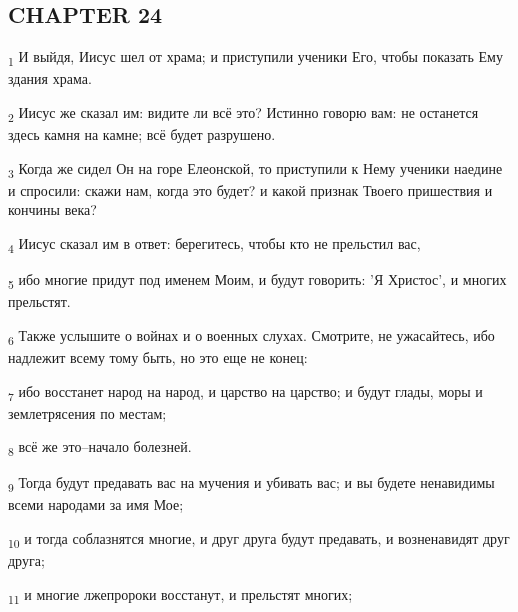 \subsection{CHAPTER 24}
\begin{tcolorbox}
\textsubscript{1} И выйдя, Иисус шел от храма; и приступили ученики Его, чтобы показать Ему здания храма.
\end{tcolorbox}
\begin{tcolorbox}
\textsubscript{2} Иисус же сказал им: видите ли всё это? Истинно говорю вам: не останется здесь камня на камне; всё будет разрушено.
\end{tcolorbox}
\begin{tcolorbox}
\textsubscript{3} Когда же сидел Он на горе Елеонской, то приступили к Нему ученики наедине и спросили: скажи нам, когда это будет? и какой признак Твоего пришествия и кончины века?
\end{tcolorbox}
\begin{tcolorbox}
\textsubscript{4} Иисус сказал им в ответ: берегитесь, чтобы кто не прельстил вас,
\end{tcolorbox}
\begin{tcolorbox}
\textsubscript{5} ибо многие придут под именем Моим, и будут говорить: 'Я Христос', и многих прельстят.
\end{tcolorbox}
\begin{tcolorbox}
\textsubscript{6} Также услышите о войнах и о военных слухах. Смотрите, не ужасайтесь, ибо надлежит всему тому быть, но это еще не конец:
\end{tcolorbox}
\begin{tcolorbox}
\textsubscript{7} ибо восстанет народ на народ, и царство на царство; и будут глады, моры и землетрясения по местам;
\end{tcolorbox}
\begin{tcolorbox}
\textsubscript{8} всё же это--начало болезней.
\end{tcolorbox}
\begin{tcolorbox}
\textsubscript{9} Тогда будут предавать вас на мучения и убивать вас; и вы будете ненавидимы всеми народами за имя Мое;
\end{tcolorbox}
\begin{tcolorbox}
\textsubscript{10} и тогда соблазнятся многие, и друг друга будут предавать, и возненавидят друг друга;
\end{tcolorbox}
\begin{tcolorbox}
\textsubscript{11} и многие лжепророки восстанут, и прельстят многих;
\end{tcolorbox}
